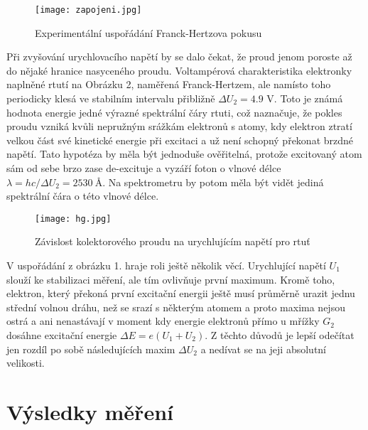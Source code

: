 \documentclass[a4paper,11pt]{article}
\begin{document}
\begin{figure}[htpb]
    \centering
    \texttt{[image: zapojeni.jpg]}
    \caption{Experimentální uspořádání Franck-Hertzova pokusu}
\end{figure}


Při zvyšování urychlovacího napětí by se dalo čekat, že proud jenom poroste až do nějaké hranice nasyceného proudu. Voltampérová charakteristika elektronky naplněné rtutí na Obrázku 2, naměřená Franck-Hertzem, ale namísto toho periodicky klesá ve stabilním intervalu přibližně $ \Delta U_2 = 4.9 $ V. Toto je známá hodnota energie jedné výrazné spektrální čáry rtuti, což naznačuje, že pokles proudu vzniká kvůli nepružným srážkám elektronů s atomy, kdy elektron ztratí velkou část své kinetické energie při excitaci a už není schopný překonat brzdné napětí. Tato hypotéza by měla být jednoduše ověřitelná, protože excitovaný atom sám od sebe brzo zase de-excituje a vyzáří foton o vlnové délce $ \lambda = hc / \Delta U_2 = 2530 \ \si{\angstrom}$. Na spektrometru by potom měla být vidět jediná spektrální čára o této vlnové délce. 


\begin{figure}[htpb]
    \centering
    \texttt{[image: hg.jpg]}
    \caption{Závislost kolektorového proudu na urychlujícím napětí pro rtuť}
\end{figure}

 V uspořádání z obrázku 1. hraje roli ještě několik věcí. Urychlující napětí $ U_1 $ slouží ke stabilizaci měření, ale tím ovlivňuje první maximum. Kromě toho, elektron, který překoná první excitační energii ještě musí průměrně urazit jednu střední volnou dráhu, než se srazí s některým atomem a proto maxima nejsou ostrá a ani nenastávají v moment kdy energie elektronů přímo u mřížky $ G_2 $ dosáhne excitační energie $ \Delta E = e( U_1 + U_2 )$. Z těchto důvodů je lepší odečítat jen rozdíl po sobě následujících maxim $ \Delta U_2 $ a nedívat se na jeji absolutní velikosti. 

\section{Výsledky měření}
\end{document}

